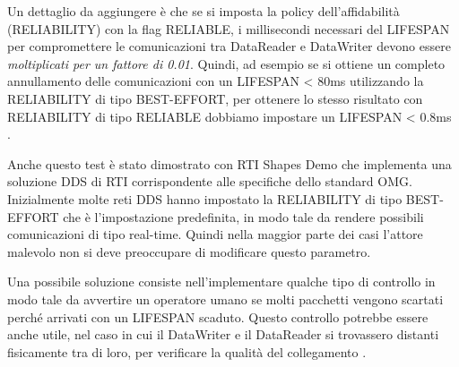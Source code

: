 Un dettaglio da aggiungere è che se si imposta la policy
dell'affidabilità (RELIABILITY) con la flag RELIABLE, i millisecondi necessari
del LIFESPAN per compromettere le comunicazioni tra DataReader e DataWriter
devono essere \textit{moltiplicati per un fattore di 0.01}. Quindi, ad esempio se si
ottiene un completo annullamento delle comunicazioni con un LIFESPAN < 80ms
utilizzando la RELIABILITY di tipo BEST-EFFORT, per ottenere lo stesso
risultato con RELIABILITY di tipo RELIABLE dobbiamo impostare un
LIFESPAN < 0.8ms
\cite{DBLP:conf/malware/MichaudDL18}.

Anche questo test è stato dimostrato con RTI Shapes Demo che 
implementa una
soluzione DDS di RTI corrispondente alle specifiche dello standard OMG.
Inizialmente molte reti DDS hanno impostato la RELIABILITY
di tipo BEST-EFFORT che è l'impostazione predefinita,
in modo tale da rendere possibili comunicazioni di tipo real-time.
Quindi nella maggior parte
dei casi l'attore malevolo 
non si deve preoccupare di modificare questo parametro.

Una possibile soluzione consiste nell'implementare qualche tipo di controllo
in modo tale da avvertire un operatore umano se molti pacchetti vengono
scartati perché arrivati con un LIFESPAN scaduto. Questo controllo potrebbe
essere anche utile, nel caso in cui il DataWriter e il DataReader si trovassero
distanti fisicamente tra di loro, per verificare la qualità del collegamento
\cite{DBLP:conf/malware/MichaudDL18}.


